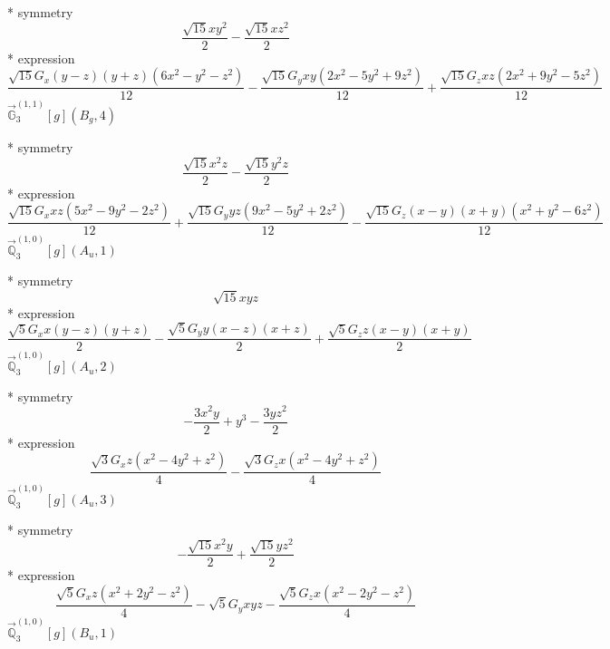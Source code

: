\documentclass[fleqn,8pt]{jsarticle}
\begin{document}
\noindent\quad ** symmetry
\begin{dmath*}
\frac{\sqrt{15} x y^{2}}{2} - \frac{\sqrt{15} x z^{2}}{2}
\end{dmath*}
\noindent\quad ** expression
\begin{dmath*}
\frac{\sqrt{15} G_{x} \left(y - z\right) \left(y + z\right) \left(6 x^{2} - y^{2} - z^{2}\right)}{12} - \frac{\sqrt{15} G_{y} x y \left(2 x^{2} - 5 y^{2} + 9 z^{2}\right)}{12} + \frac{\sqrt{15} G_{z} x z \left(2 x^{2} + 9 y^{2} - 5 z^{2}\right)}{12}
\end{dmath*}
\noindent\quad $\vec{\mathbb{G}}_{3}^{(1,1)}[g](B_{g},4)$

\noindent\quad ** symmetry
\begin{dmath*}
\frac{\sqrt{15} x^{2} z}{2} - \frac{\sqrt{15} y^{2} z}{2}
\end{dmath*}
\noindent\quad ** expression
\begin{dmath*}
\frac{\sqrt{15} G_{x} x z \left(5 x^{2} - 9 y^{2} - 2 z^{2}\right)}{12} + \frac{\sqrt{15} G_{y} y z \left(9 x^{2} - 5 y^{2} + 2 z^{2}\right)}{12} - \frac{\sqrt{15} G_{z} \left(x - y\right) \left(x + y\right) \left(x^{2} + y^{2} - 6 z^{2}\right)}{12}
\end{dmath*}
\noindent\quad $\vec{\mathbb{Q}}_{3}^{(1,0)}[g](A_{u},1)$

\noindent\quad ** symmetry
\begin{dmath*}
\sqrt{15} x y z
\end{dmath*}
\noindent\quad ** expression
\begin{dmath*}
\frac{\sqrt{5} G_{x} x \left(y - z\right) \left(y + z\right)}{2} - \frac{\sqrt{5} G_{y} y \left(x - z\right) \left(x + z\right)}{2} + \frac{\sqrt{5} G_{z} z \left(x - y\right) \left(x + y\right)}{2}
\end{dmath*}
\noindent\quad $\vec{\mathbb{Q}}_{3}^{(1,0)}[g](A_{u},2)$

\noindent\quad ** symmetry
\begin{dmath*}
- \frac{3 x^{2} y}{2} + y^{3} - \frac{3 y z^{2}}{2}
\end{dmath*}
\noindent\quad ** expression
\begin{dmath*}
\frac{\sqrt{3} G_{x} z \left(x^{2} - 4 y^{2} + z^{2}\right)}{4} - \frac{\sqrt{3} G_{z} x \left(x^{2} - 4 y^{2} + z^{2}\right)}{4}
\end{dmath*}
\noindent\quad $\vec{\mathbb{Q}}_{3}^{(1,0)}[g](A_{u},3)$

\noindent\quad ** symmetry
\begin{dmath*}
- \frac{\sqrt{15} x^{2} y}{2} + \frac{\sqrt{15} y z^{2}}{2}
\end{dmath*}
\noindent\quad ** expression
\begin{dmath*}
\frac{\sqrt{5} G_{x} z \left(x^{2} + 2 y^{2} - z^{2}\right)}{4} - \sqrt{5} G_{y} x y z - \frac{\sqrt{5} G_{z} x \left(x^{2} - 2 y^{2} - z^{2}\right)}{4}
\end{dmath*}
\noindent\quad $\vec{\mathbb{Q}}_{3}^{(1,0)}[g](B_{u},1)$
\end{document}
